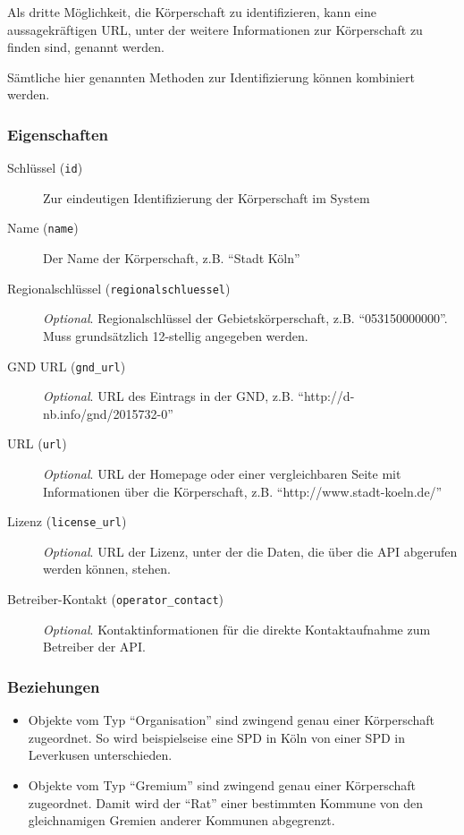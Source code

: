 \documentclass[,a4paper]{article}
\begin{document}
Als dritte Möglichkeit, die Körperschaft zu identifizieren, kann eine
aussagekräftigen URL, unter der weitere Informationen zur Körperschaft
zu finden sind, genannt werden.

Sämtliche hier genannten Methoden zur Identifizierung können kombiniert
werden.

\subsubsection{Eigenschaften}

\begin{description}
\item[Schlüssel (\texttt{id})]
Zur eindeutigen Identifizierung der Körperschaft im System
\item[Name (\texttt{name})]
Der Name der Körperschaft, z.B. ``Stadt Köln''
\item[Regionalschlüssel (\texttt{regionalschluessel})]
\emph{Optional}. Regionalschlüssel der Gebietskörperschaft, z.B.
``053150000000''. Muss grundsätzlich 12-stellig angegeben werden.
\item[GND URL (\texttt{gnd\_url})]
\emph{Optional}. URL des Eintrags in der GND, z.B.
``http://d-nb.info/gnd/2015732-0''
\item[URL (\texttt{url})]
\emph{Optional}. URL der Homepage oder einer vergleichbaren Seite mit
Informationen über die Körperschaft, z.B. ``http://www.stadt-koeln.de/''
\item[Lizenz (\texttt{license\_url})]
\emph{Optional}. URL der Lizenz, unter der die Daten, die über die API
abgerufen werden können, stehen.
\item[Betreiber-Kontakt (\texttt{operator\_contact})]
\emph{Optional}. Kontaktinformationen für die direkte Kontaktaufnahme
zum Betreiber der API.
\end{description}

\subsubsection{Beziehungen}

\begin{itemize}
\item
  Objekte vom Typ ``Organisation'' sind zwingend genau einer
  Körperschaft zugeordnet. So wird beispielseise eine SPD in Köln von
  einer SPD in Leverkusen unterschieden.
\item
  Objekte vom Typ ``Gremium'' sind zwingend genau einer Körperschaft
  zugeordnet. Damit wird der ``Rat'' einer bestimmten Kommune von den
  gleichnamigen Gremien anderer Kommunen abgegrenzt.
\end{itemize}
\end{document}
